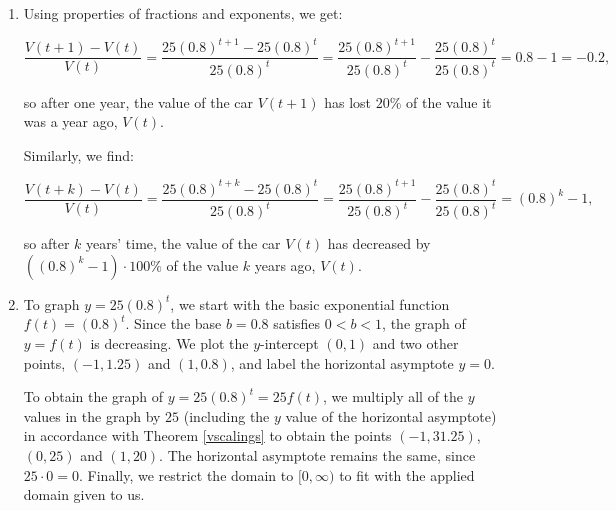 \documentclass{ximera}
\begin{document}
\begin{example}
\begin{explanation}
\begin{enumerate}
\[ \frac{V(1) - V(0)}{V(0)} = \frac{V(1)}{V(0)} - \frac{V(0)}{V(0)} = \frac{V(1)}{V(0)} - 1, \]

and since $\frac{V(1)}{V(0)} = 0.8$, we get  $\frac{V(1) - V(0)}{V(0)} = 1 - 0.8 = -0.2$.

Likewise, the ratio $\frac{V(2) - V(1)}{V(1)} = -0.2$ means the value of the car has lost $20 \%$  of its value over the course of the second year of ownership.

Finally,  the ratio $\frac{V(2) - V(0)}{V(0)}  = -0.36$ means that over the first two years of ownership, the car value has depreciated $36 \%$ of its initial purchase price. Again, this tracks with the result of number  \ref{georatio1} which tells us that after two years, the car is only worth $64 \%$ of its initial purchase price.

\item  Using properties of fractions and exponents, we get:

\[ \frac{V(t+1) - V(t)}{V(t)} = \frac{25(0.8)^{t+1} - 25(0.8)^{t}}{25 (0.8)^{t}} = \frac{25(0.8)^{t+1}}{25 (0.8)^{t}} - \frac{25 (0.8)^{t}}{25 (0.8)^{t}} = 0.8 - 1 = -0.2, \]

so  after one year, the value of the car $V(t+1)$ has lost $20 \%$ of the value it was a year ago, $V(t)$.

Similarly, we find:

\[ \frac{V(t+k) - V(t)}{V(t)} = \frac{25(0.8)^{t+k} - 25(0.8)^{t}}{25 (0.8)^{t}} = \frac{25(0.8)^{t+1}}{25 (0.8)^{t}} - \frac{25 (0.8)^{t}}{25 (0.8)^{t}} = (0.8)^{k} - 1, \]

so  after $k$ years' time, the value of the car $V(t)$ has decreased by $((0.8)^{k} - 1) \cdot 100 \%$ of the value $k$ years ago, $V(t)$.

\item  To graph $y=25(0.8)^{t}$,  we start with the basic exponential function $f(t)=(0.8)^{t}$.  Since the base $b = 0.8$  satisfies $0 < b <1$, the graph of $y=f(t)$ is decreasing.  We plot the $y$-intercept $(0,1)$ and two other points, $(-1, 1.25 )$ and $(1,0.8)$, and label the horizontal asymptote $y=0$. 

 To obtain the graph of  $y = 25(0.8)^t = 25 f(t)$, we multiply all of the $y$ values in the graph by $25$ (including the $y$ value of the horizontal asymptote) in accordance with Theorem \ref{vscalings} to obtain the points $(-1, 31.25)$, $(0, 25)$ and $(1,20)$. The horizontal asymptote remains the same, since $25 \cdot 0 = 0$.   Finally, we restrict the domain to $[0,\infty)$ to fit with the applied domain given to us. 


\end{enumerate}
\end{explanation}
\end{example}
\end{document}
